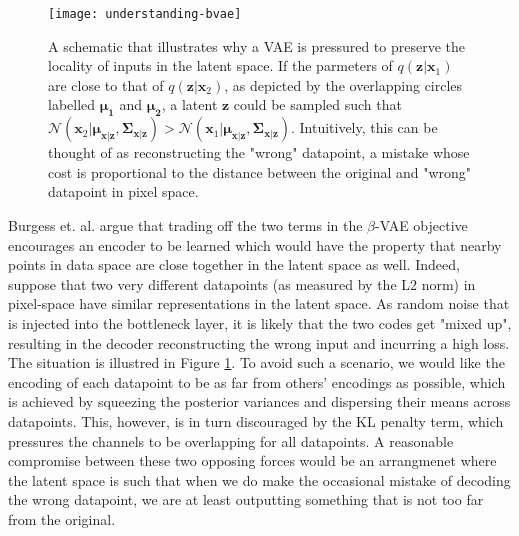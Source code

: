 \documentclass{report}
\begin{document}
\begin{figure}[H]
\begin{center}
\texttt{[image: understanding-bvae]}
\caption{A schematic that illustrates why a VAE is pressured to preserve the locality of inputs in the latent space. If the parmeters of $q(\boldsymbol{z} | \boldsymbol{x}_1)$ are close to that of $q(\boldsymbol{z} | \boldsymbol{x}_2)$, as depicted by the overlapping circles labelled $\boldsymbol{\mu_1}$ and $\boldsymbol{\mu_2}$, a latent $\boldsymbol{z}$ could be sampled such that $\mathcal{N}(\boldsymbol{x}_2|\boldsymbol{\mu_{x|z}}, \boldsymbol{\Sigma_{x|z}}) > \mathcal{N}(\boldsymbol{x}_1|\boldsymbol{\mu_{x|z}}, \boldsymbol{\Sigma_{x|z}})$. Intuitively, this can be thought of as reconstructing the "wrong" datapoint, a mistake whose cost is proportional to the distance between the original and "wrong" datapoint in pixel space.}
\label{fig:understanding-bvae}
\end{center}
\end{figure}

\noindent Burgess et. al. \cite{understanding-beta-vae} argue that trading off the two terms in the $\beta$-VAE objective encourages an encoder to be learned which would have the property that nearby points in data space are close together in the latent space as well. Indeed, suppose that two very different datapoints (as measured by the L2 norm) in pixel-space have similar representations in the latent space. As random noise that is injected into the bottleneck layer, it is likely that the two codes get "mixed up", resulting in the decoder reconstructing the wrong input and incurring a high loss. The situation is illustred in Figure \ref{fig:understanding-bvae}. To avoid such a scenario, we would like the encoding of each datapoint to be as far from others' encodings as possible, which is achieved by squeezing the posterior variances and dispersing their means across datapoints. This, however, is in turn discouraged by the KL penalty term, which pressures the channels to be overlapping for all datapoints. A reasonable compromise between these two opposing forces would be an arrangmenet where the latent space is such that when we do make the occasional mistake of decoding the wrong datapoint, we are at least outputting something that is not too far from the original. \\
\end{document}
